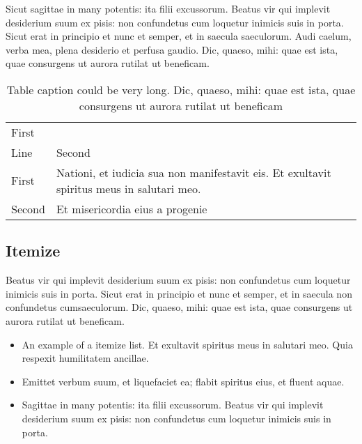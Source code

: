 \documentclass{ao2e}%
\begin{document}
Sicut sagittae in many potentis: ita filii excussorum. Beatus vir qui
implevit desiderium suum ex pisis: non confundetus cum loquetur inimicis
suis in porta.  Sicut erat in principio et nunc et semper, et in saecula
saeculorum. Audi caelum, verba mea, plena desiderio et perfusa gaudio.
Dic, quaeso, mihi: quae est ista, quae consurgens ut aurora rutilat ut
beneficam.

\begin{table}[t]

\caption{Table caption could be very long.
Dic, quaeso, mihi: quae est ista, quae consurgens ut aurora rutilat
ut beneficam}

\begin{tabular*}{\columnwidth}{lp{5cm}}
\hline
First &       \\
Line  & Second \\
\hline
First  & Nationi, et iudicia sua non manifestavit eis. Et exultavit spiritus meus
                    in salutari meo.\\

Second & Et misericordia eius a progenie\\
\hline
\end{tabular*}
\end{table}



\subsection{Itemize}

Beatus vir qui implevit desiderium
suum ex pisis: non confundetus cum loquetur inimicis suis in porta.
Sicut erat in principio et nunc et semper, et in saecula non
confundetus cumsaeculorum. Dic, quaeso, mihi: quae est ista, quae
consurgens ut aurora rutilat ut beneficam.

\begin{itemize}
\item An example of a itemize list. Et exultavit spiritus meus in salutari meo.
Quia respexit humilitatem ancillae.

\item Emittet verbum suum, et liquefaciet
ea; flabit spiritus eius, et fluent aquae.

\item Sagittae in many potentis:
ita filii excussorum.  Beatus vir qui implevit desiderium suum ex
pisis: non confundetus cum loquetur inimicis suis in porta.
\end{itemize}
\end{document}
